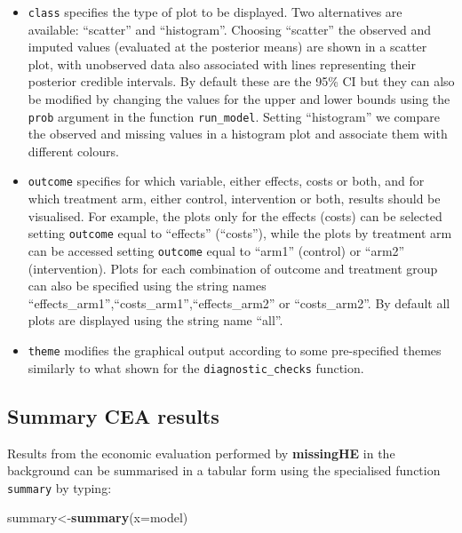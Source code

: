 \documentclass[]{article}
\newenvironment{Shaded}{\begin{snugshade}}{\end{snugshade}}
\newcommand{\KeywordTok}[1]{\textcolor[rgb]{0.13,0.29,0.53}{\textbf{{#1}}}}
\newcommand{\DataTypeTok}[1]{\textcolor[rgb]{0.13,0.29,0.53}{{#1}}}
\newcommand{\NormalTok}[1]{{#1}}
\begin{document}
\begin{itemize}
\item
  \texttt{class} specifies the type of plot to be displayed. Two
  alternatives are available: ``scatter'' and ``histogram''. Choosing
  ``scatter'' the observed and imputed values (evaluated at the
  posterior means) are shown in a scatter plot, with unobserved data
  also associated with lines representing their posterior credible
  intervals. By default these are the 95\% CI but they can also be
  modified by changing the values for the upper and lower bounds using
  the \texttt{prob} argument in the function \texttt{run\_model}.
  Setting ``histogram'' we compare the observed and missing values in a
  histogram plot and associate them with different colours.
\item
  \texttt{outcome} specifies for which variable, either effects, costs
  or both, and for which treatment arm, either control, intervention or
  both, results should be visualised. For example, the plots only for
  the effects (costs) can be selected setting \texttt{outcome} equal to
  ``effects'' (``costs''), while the plots by treatment arm can be
  accessed setting \texttt{outcome} equal to ``arm1'' (control) or
  ``arm2'' (intervention). Plots for each combination of outcome and
  treatment group can also be specified using the string names
  ``effects\_arm1'',``costs\_arm1'',``effects\_arm2'' or
  ``costs\_arm2''. By default all plots are displayed using the string
  name ``all''.
\item
  \texttt{theme} modifies the graphical output according to some
  pre-specified themes similarly to what shown for the
  \texttt{diagnostic\_checks} function.
\end{itemize}

\subsection{Summary CEA results}\label{summary-cea-results}

Results from the economic evaluation performed by \textbf{missingHE} in
the background can be summarised in a tabular form using the specialised
function \texttt{summary} by typing:

\begin{Shaded}
\begin{Highlighting}[]
\NormalTok{summary<-}\KeywordTok{summary}\NormalTok{(}\DataTypeTok{x=}\NormalTok{model)}
\end{Highlighting}
\end{Shaded}
\end{document}
